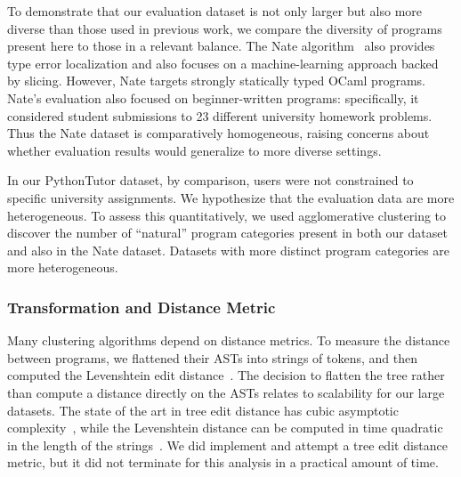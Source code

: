 \documentclass[conference]{IEEEtran}
\begin{document}
To demonstrate that our evaluation dataset is not only larger but also more
diverse than those used in previous work, we compare the diversity of
programs present here to those in a relevant balance. The Nate
algorithm~\cite{learning-to-blame} also provides type error localization
and also focuses on a machine-learning approach backed by slicing. However,
Nate targets strongly statically typed OCaml programs. Nate's evaluation
also focused on beginner-written programs: specifically, it considered
student submissions to 23 different university homework problems.  Thus the
Nate dataset is comparatively homogeneous, raising concerns about whether
evaluation results would generalize to more diverse settings.

In our PythonTutor dataset, by comparison, users were not constrained to
specific university assignments. We hypothesize that the evaluation data are
more heterogeneous. To assess this quantitatively, we used agglomerative
clustering to discover the number of ``natural'' program categories
present in both our dataset and also in the Nate dataset. Datasets with
more distinct program categories are more heterogeneous.



\subsubsection{Transformation and Distance Metric}

Many clustering algorithms depend on distance metrics.
To measure the distance between programs, we flattened their ASTs into
strings of tokens, and then computed the Levenshtein edit
distance~\cite{levenshtein}. The decision to flatten the tree rather than
compute a distance directly on the ASTs relates to scalability for our
large datasets. The state of the art in tree edit distance has cubic
asymptotic complexity~\cite{PAWLIK2016157}, while the Levenshtein distance
can be computed in time quadratic in the length of the
strings~\cite{lev-quadratic}. We did implement and attempt a tree edit
distance metric, but it did not terminate for this analysis in a practical
amount of time.
\end{document}
